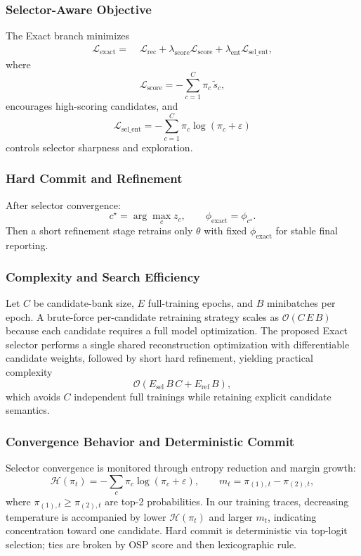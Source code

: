 \documentclass[journal]{IEEEtran}
\begin{document}
\subsubsection{Selector-Aware Objective}
The Exact branch minimizes
\begin{align}
\mathcal{L}_{\mathrm{exact}}
=\;&
\mathcal{L}_{\mathrm{rec}}
+\lambda_{\mathrm{score}}\mathcal{L}_{\mathrm{score}}
+\lambda_{\mathrm{ent}}\mathcal{L}_{\mathrm{sel\_ent}},
\end{align}
where
\begin{equation}
\mathcal{L}_{\mathrm{score}}
=
-\sum_{c=1}^{C}\pi_c\,\tilde{s}_c,
\end{equation}
encourages high-scoring candidates, and
\begin{equation}
\mathcal{L}_{\mathrm{sel\_ent}}
=
-\sum_{c=1}^{C}\pi_c\log(\pi_c+\varepsilon)
\end{equation}
controls selector sharpness and exploration.

\subsubsection{Hard Commit and Refinement}
After selector convergence:
\begin{equation}
c^{\star}=\arg\max_c z_c,\qquad \phi_{\mathrm{exact}}=\phi_{c^{\star}}.
\end{equation}
Then a short refinement stage retrains only $\theta$ with fixed $\phi_{\mathrm{exact}}$ for stable final reporting.

\subsubsection{Complexity and Search Efficiency}
Let $C$ be candidate-bank size, $E$ full-training epochs, and $B$ minibatches per epoch. A brute-force per-candidate retraining strategy scales as $\mathcal{O}(C\,E\,B)$ because each candidate requires a full model optimization. The proposed Exact selector performs a single shared reconstruction optimization with differentiable candidate weights, followed by short hard refinement, yielding practical complexity
\begin{equation}
\mathcal{O}(E_{\mathrm{sel}}\,B\,C + E_{\mathrm{ref}}\,B),
\end{equation}
which avoids $C$ independent full trainings while retaining explicit candidate semantics.

\subsubsection{Convergence Behavior and Deterministic Commit}
Selector convergence is monitored through entropy reduction and margin growth:
\begin{equation}
\mathcal{H}(\pi_t)=-\sum_c \pi_c\log(\pi_c+\varepsilon),\qquad
m_t=\pi_{(1),t}-\pi_{(2),t},
\end{equation}
where $\pi_{(1),t}\ge\pi_{(2),t}$ are top-2 probabilities. In our training traces, decreasing temperature is accompanied by lower $\mathcal{H}(\pi_t)$ and larger $m_t$, indicating concentration toward one candidate. Hard commit is deterministic via top-logit selection; ties are broken by OSP score and then lexicographic rule.
\end{document}
